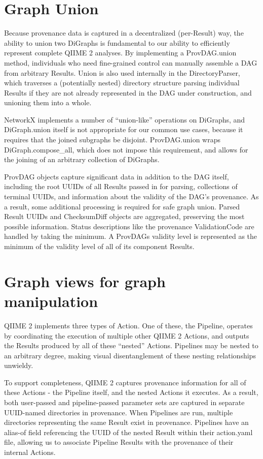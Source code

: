 \section{Graph Union}

Because provenance data is captured in a decentralized (per-Result) way, the
ability to union two DiGraphs is fundamental to our ability to efficiently
represent complete QIIME 2 analyses. By implementing a ProvDAG.union method,
individuals who need fine-grained control can manually assemble a DAG from
arbitrary Results. Union is also used internally in the DirectoryParser, which
traverses a (potentially nested) directory structure parsing individual Results
if they are not already represented in the DAG under construction, and unioning
them into a whole.

NetworkX implements a number of “union-like” operations on DiGraphs, and
DiGraph.union itself is not appropriate for our common use cases, because it
requires that the joined subgraphs be disjoint. ProvDAG.union wraps
DiGraph.compose\_all, which does not impose this requirement, and allows for the
joining of an arbitrary collection of DiGraphs.

ProvDAG objects capture significant data in addition to the DAG itself,
including the root UUIDs of all Results passed in for parsing, collections of
terminal UUIDs, and information about the validity of the DAG’s provenance. As a
result, some additional processing is required for safe graph union. Parsed
Result UUIDs and ChecksumDiff objects are aggregated, preserving the most
possible information. Status descriptions like the provenance ValidationCode are
handled by taking the minimum. A ProvDAGs validity level is represented as the
minimum of the validity level of all of its component Results.

\section{Graph views for graph manipulation}

QIIME 2 implements three types of Action. One of these, the Pipeline, operates
by coordinating the execution of multiple other QIIME 2 Actions, and outputs the
Results produced by all of these “nested” Actions. Pipelines may be nested to an
arbitrary degree, making visual disentanglement of these nesting relationships
unwieldy.

To support completeness, QIIME 2 captures provenance information for all of
these Actions - the Pipeline itself, and the nested Actions it executes. As a
result, both user-passed and pipeline-passed parameter sets are captured in
separate UUID-named directories in provenance. When Pipelines are run, multiple
directories representing the same Result exist in provenance. Pipelines have an
alias-of field referencing the UUID of the nested Result within their
action.yaml file, allowing us to associate Pipeline Results with the provenance
of their internal Actions. 

